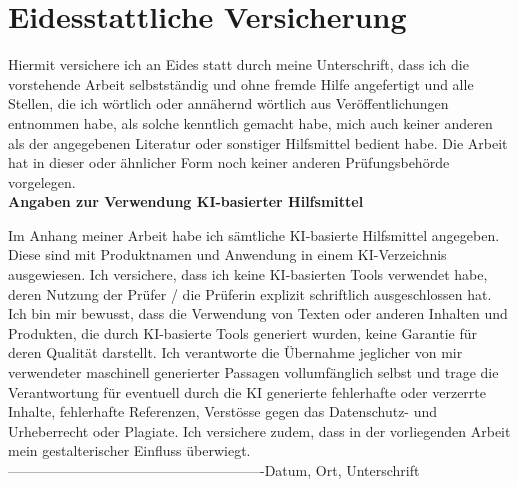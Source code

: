 \section*{Eidesstattliche Versicherung}
Hiermit versichere ich an Eides statt durch meine Unterschrift, dass ich die vorstehende Arbeit selbstst\"andig und ohne fremde Hilfe angefertigt und alle Stellen, die ich w\"ortlich oder ann\"ahernd w\"ortlich aus Ver\"offentlichungen entnommen habe, als solche kenntlich gemacht habe, mich auch keiner anderen als der angegebenen Literatur oder sonstiger Hilfsmittel bedient habe. Die Arbeit hat in dieser oder \"ahnlicher Form noch keiner anderen Pr\"ufungsbeh\"orde vorgelegen.\\

\textbf{Angaben zur Verwendung KI-basierter Hilfsmittel}

Im Anhang meiner Arbeit habe ich s\"amtliche KI-basierte Hilfsmittel angegeben. Diese sind mit Produktnamen und Anwendung in einem KI-Verzeichnis ausgewiesen. Ich versichere, dass ich keine KI-basierten Tools verwendet habe, deren Nutzung der Pr\"ufer / die Pr\"uferin explizit schriftlich ausgeschlossen hat. Ich bin mir bewusst, dass die Verwendung von Texten oder anderen Inhalten und Produkten, die durch KI-basierte Tools generiert wurden, keine Garantie f\"ur deren Qualit\"at darstellt. Ich verantworte die \"Ubernahme jeglicher von mir verwendeter maschinell generierter Passagen vollumf\"anglich selbst und trage die Verantwortung f\"ur eventuell durch die KI generierte fehlerhafte oder verzerrte Inhalte, fehlerhafte Referenzen, Verst\"osse gegen das Datenschutz- und Urheberrecht oder Plagiate. Ich versichere zudem, dass in der vorliegenden Arbeit mein gestalterischer Einfluss \"uberwiegt. \\
\linebreak[4]
\linebreak[4]
\linebreak[4]
\linebreak[4]
-------------------------------------------------------\linebreak[4]
Datum, Ort, Unterschrift